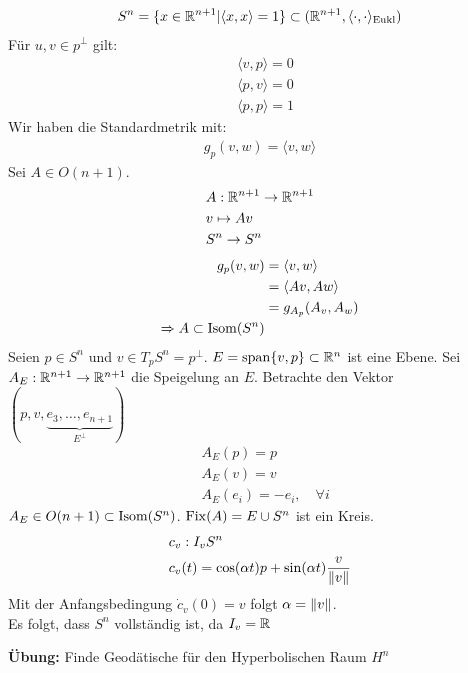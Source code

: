 \begin{bsp}
\begin{align}
S^n = \{ x \in \mathbb{R}^{n+1} \vert \langle x, x\rangle  = 1\} \subset (\mathbb{R}^{n+1}, \langle \cdot, \cdot \rangle_{\mathrm{Eukl}})
\end{align}
Für $u, v \in p^\perp$ gilt:
\begin{align*}
& \langle v, p \rangle = 0\\
& \langle p, v \rangle = 0\\
& \langle p, p \rangle = 1
\end{align*}
Wir haben die Standardmetrik mit:
\begin{align*}
g_p (v, w) = \langle v, w\rangle 
\end{align*}
Sei $A \in O(n+1)$.
\begin{align*}
& A: \mathbb{R}^{n+1} \to \mathbb{R}^{n+1}\\
& v \mapsto A v \\
& S^n \to S^n
\end{align*}
\begin{align*}
g_p (v, w) &= \langle v, w\rangle\\
&= \langle Av, Aw \rangle\\ 
&= g_{A_p} (A_v, A_w)\\
\Rightarrow A \subset \operatorname{Isom} (S^n)
\end{align*}
Seien $p \in S^n$ und $v \in T_p S^n = p^\perp$.
$E = \mathrm{span} \{ v, p \} \subset \mathbb{R}^n$ ist eine Ebene.
Sei $A_E : \mathbb{R}^{n+1} \to \mathbb{R}^{n+1}$ die Speigelung an $E$.
Betrachte den Vektor $(p, v, \underbrace{e_3, \dots, e_{n+1}}_{E^\perp})$
\begin{align*}
&A_E (p) = p\\
& A_E (v) = v\\
& A_E(e_i) = - e_i, \quad \forall i
\end{align*}
$A_E \in O(n+1)  \subset \operatorname{Isom} (S^n)$.
$\operatorname{Fix} (A) = E \cup S^n$ ist ein Kreis.
\begin{align}
&c_v : I_v S^n\\
&c_v(t) = \cos (\alpha t) p + \sin (\alpha t) \frac{v}{\norm{v}}
\end{align}
Mit der Anfangsbedingung $\dot{c}_v (0) = v$ folgt $\alpha = \norm{v}$.\\
Es folgt, dass $S^n$ vollständig ist, da $I_v = \mathbb{R}$
\end{bsp}
\textbf{Übung:} Finde Geodätische für den Hyperbolischen Raum $H^n$



